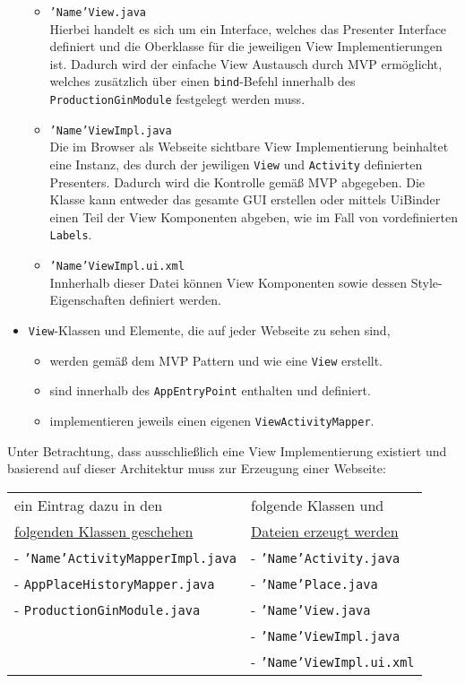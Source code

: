 \begin{itemize}
\begin{itemize}
    \item \texttt{'Name'View.java}\\
    Hierbei handelt es sich um ein Interface, welches das Presenter Interface
    definiert und die Oberklasse für die jeweiligen View Implementierungen ist.
    Dadurch wird der einfache View Austausch durch MVP ermöglicht, welches
    zusätzlich über einen \texttt{bind}-Befehl innerhalb des
    \texttt{ProductionGinModule} festgelegt werden muss.
    \item \texttt{'Name'ViewImpl.java}\\
    Die im Browser als Webseite sichtbare View Implementierung beinhaltet eine
    Instanz, des durch der jewiligen \texttt{View} und \texttt{Activity}
    definierten Presenters. Dadurch wird die Kontrolle gemäß MVP abgegeben. Die
    Klasse kann entweder das gesamte GUI erstellen oder mittels UiBinder einen
    Teil der View Komponenten abgeben, wie im Fall von vordefinierten
    \texttt{Labels}.
    \item \texttt{'Name'ViewImpl.ui.xml}\\
    Innherhalb dieser Datei können View Komponenten sowie dessen
    Style-Eigenschaften definiert werden.
  \end{itemize} 
  \item \texttt{View}-Klassen und Elemente, die auf jeder Webseite zu sehen
  sind,
    \begin{itemize}
    \item werden gemäß dem MVP Pattern und wie eine \texttt{View} erstellt.
    \item sind innerhalb des \texttt{AppEntryPoint} enthalten und definiert.
    \item implementieren jeweils einen eigenen
    \texttt{ViewActivityMapper}.
  \end{itemize} 
\end{itemize}
Unter Betrachtung, dass ausschließlich eine View Implementierung existiert
und basierend auf dieser Architektur muss zur Erzeugung einer Webseite:\\
\begin{tabular}{ll} 
\addlinespace
ein Eintrag dazu in den &  \quad \quad folgende Klassen und\\
\underline{folgenden Klassen geschehen} & \quad \quad \underline{Dateien erzeugt
werden}
\\
\addlinespace
\addlinespace
  - \texttt{'Name'ActivityMapperImpl.java} & \quad \quad -
  \texttt{'Name'Activity.java}\\
  - \texttt{AppPlaceHistoryMapper.java} & \quad \quad -
  \texttt{'Name'Place.java}\\
  - \texttt{ProductionGinModule.java} & \quad \quad -
  \texttt{'Name'View.java}\\
    	& \quad \quad - \texttt{'Name'ViewImpl.java}\\
    	& \quad \quad - \texttt{'Name'ViewImpl.ui.xml}\\
\end{tabular}\\
